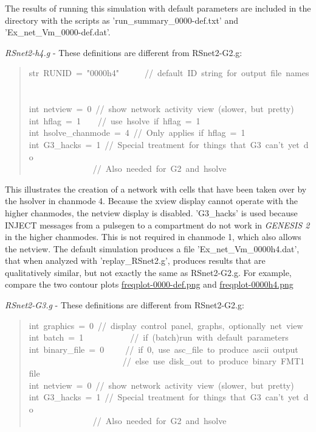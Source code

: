 \documentclass[10pt,a4paper,english]{article}
\begin{document}
The results of running this simulation with default parameters are
included in the directory with the scripts as 'run{\_}summary{\_}0000-def.txt'
and 'Ex{\_}net{\_}Vm{\_}0000-def.dat'.

\emph{RSnet2-h4.g} - These definitions are different from RSnet2-G2.g:
\begin{quote}{\ttfamily \raggedright \noindent
str~RUNID~=~"0000h4"~~~~~~//~default~ID~string~for~output~file~names~\\
~\\
int~netview~=~0~//~show~network~activity~view~(slower,~but~pretty)~\\
int~hflag~=~1~~~~//~use~hsolve~if~hflag~=~1~\\
int~hsolve{\_}chanmode~=~4~//~Only~applies~if~hflag~=~1~\\
int~G3{\_}hacks~=~1~//~Special~treatment~for~things~that~G3~can't~yet~do~\\
~~~~~~~~~~~~~~~//~Also~needed~for~G2~and~hsolve
}\end{quote}

This illustrates the creation of a network with cells that have been taken
over by the hsolver in chanmode 4.  Because the xview display cannot
operate with the higher chanmodes, the netview display is disabled.
'G3{\_}hacks' is used because INJECT messages from a pulsegen to a compartment
do not work in \emph{GENESIS 2} in the higher chanmodes.  This is not required
in chanmode 1, which also allows the netview.  The default simulation
produces a file 'Ex{\_}net{\_}Vm{\_}0000h4.dat', that when analyzed with
'replay{\_}RSnet2.g', produces results that are qualitatively similar,
but not exactly the same as RSnet2-G2.g.  For example, compare
the two contour plots \href{figures/freqplot-0000-def.png}{freqplot-0000-def.png} and \href{figures/freqplot-0000h4.png}{freqplot-0000h4.png}

\emph{RSnet2-G3.g} - These definitions are different from RSnet2-G2.g:
\begin{quote}{\ttfamily \raggedright \noindent
int~graphics~=~0~//~display~control~panel,~graphs,~optionally~net~view~\\
int~batch~=~1~~~~~~~~~~~//~if~(batch)run~with~default~parameters~\\
int~binary{\_}file~=~0~~~~~//~if~0,~use~asc{\_}file~to~produce~ascii~output~\\
~~~~~~~~~~~~~~~~~~~~~~//~else~use~disk{\_}out~to~produce~binary~FMT1~file~\\
int~netview~=~0~//~show~network~activity~view~(slower,~but~pretty)~\\
int~G3{\_}hacks~=~1~//~Special~treatment~for~things~that~G3~can't~yet~do~\\
~~~~~~~~~~~~~~~//~Also~needed~for~G2~and~hsolve
}\end{quote}
\end{document}
